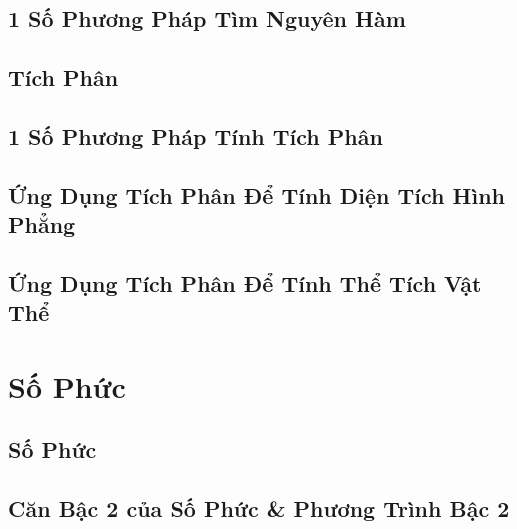 \documentclass[oneside]{book}
\numberwithin{equation}{section}
\begin{document}

\section{1 Số Phương Pháp Tìm Nguyên Hàm}


\section{Tích Phân}


\section{1 Số Phương Pháp Tính Tích Phân}


\section{Ứng Dụng Tích Phân Để Tính Diện Tích Hình Phẳng}


\section{Ứng Dụng Tích Phân Để Tính Thể Tích Vật Thể}


\chapter{Số Phức}

\section{Số Phức}


\section{Căn Bậc 2 của Số Phức \& Phương Trình Bậc 2}
\end{document}

